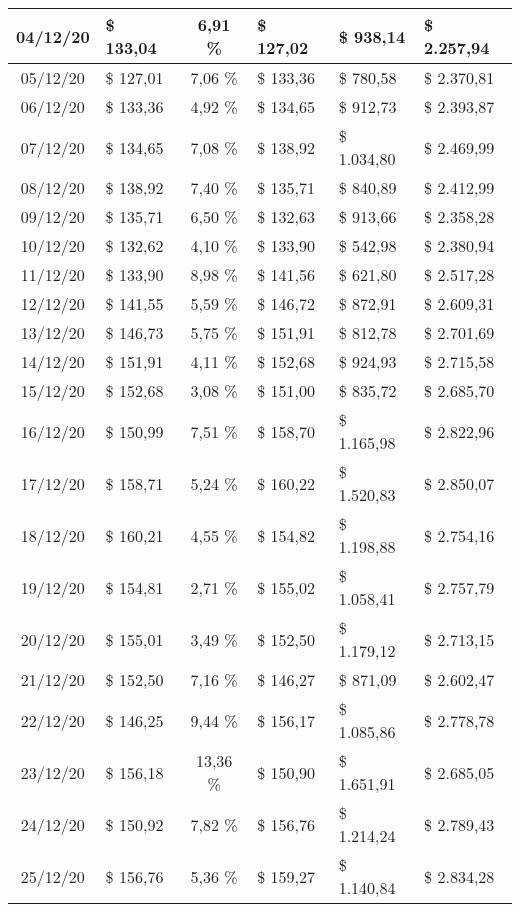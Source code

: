 \begin{center}
\begin{small}
\begin{longtable}{|c|l|c|l|l|l|}
04/12/20 & \$ 133,04 & 6,91 \% & \$ 127,02 & \$ 938,14 & \$ 2.257,94 \\ \hline
05/12/20 & \$ 127,01 & 7,06 \% & \$ 133,36 & \$ 780,58 & \$ 2.370,81 \\ \hline
06/12/20 & \$ 133,36 & 4,92 \% & \$ 134,65 & \$ 912,73 & \$ 2.393,87 \\ \hline
07/12/20 & \$ 134,65 & 7,08 \% & \$ 138,92 & \$ 1.034,80 & \$ 2.469,99 \\ \hline
08/12/20 & \$ 138,92 & 7,40 \% & \$ 135,71 & \$ 840,89 & \$ 2.412,99 \\ \hline
09/12/20 & \$ 135,71 & 6,50 \% & \$ 132,63 & \$ 913,66 & \$ 2.358,28 \\ \hline
10/12/20 & \$ 132,62 & 4,10 \% & \$ 133,90 & \$ 542,98 & \$ 2.380,94 \\ \hline
11/12/20 & \$ 133,90 & 8,98 \% & \$ 141,56 & \$ 621,80 & \$ 2.517,28 \\ \hline
12/12/20 & \$ 141,55 & 5,59 \% & \$ 146,72 & \$ 872,91 & \$ 2.609,31 \\ \hline
13/12/20 & \$ 146,73 & 5,75 \% & \$ 151,91 & \$ 812,78 & \$ 2.701,69 \\ \hline
14/12/20 & \$ 151,91 & 4,11 \% & \$ 152,68 & \$ 924,93 & \$ 2.715,58 \\ \hline
15/12/20 & \$ 152,68 & 3,08 \% & \$ 151,00 & \$ 835,72 & \$ 2.685,70 \\ \hline
16/12/20 & \$ 150,99 & 7,51 \% & \$ 158,70 & \$ 1.165,98 & \$ 2.822,96 \\ \hline
17/12/20 & \$ 158,71 & 5,24 \% & \$ 160,22 & \$ 1.520,83 & \$ 2.850,07 \\ \hline
18/12/20 & \$ 160,21 & 4,55 \% & \$ 154,82 & \$ 1.198,88 & \$ 2.754,16 \\ \hline
19/12/20 & \$ 154,81 & 2,71 \% & \$ 155,02 & \$ 1.058,41 & \$ 2.757,79 \\ \hline
20/12/20 & \$ 155,01 & 3,49 \% & \$ 152,50 & \$ 1.179,12 & \$ 2.713,15 \\ \hline
21/12/20 & \$ 152,50 & 7,16 \% & \$ 146,27 & \$ 871,09 & \$ 2.602,47 \\ \hline
22/12/20 & \$ 146,25 & 9,44 \% & \$ 156,17 & \$ 1.085,86 & \$ 2.778,78 \\ \hline
23/12/20 & \$ 156,18 & 13,36 \% & \$ 150,90 & \$ 1.651,91 & \$ 2.685,05 \\ \hline
24/12/20 & \$ 150,92 & 7,82 \% & \$ 156,76 & \$ 1.214,24 & \$ 2.789,43 \\ \hline
25/12/20 & \$ 156,76 & 5,36 \% & \$ 159,27 & \$ 1.140,84 & \$ 2.834,28 \\ \hline

\end{longtable}
\end{small}
\end{center}
